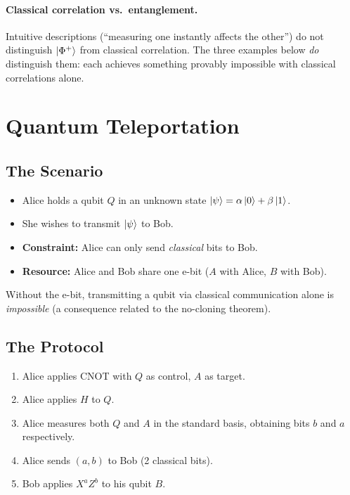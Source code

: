 \documentclass[11pt]{article}
\theoremstyle{definition}
\begin{document}
\paragraph{Classical correlation vs.\ entanglement.}
Intuitive descriptions (``measuring one instantly affects the other'') do not distinguish $\ket{\Phi^+}$ from classical correlation.  The three examples below \emph{do} distinguish them: each achieves something provably impossible with classical correlations alone.

\section{Quantum Teleportation}

\subsection{The Scenario}

\begin{itemize}
    \item Alice holds a qubit $Q$ in an unknown state $\ket{\psi}=\alpha\ket{0}+\beta\ket{1}$.
    \item She wishes to transmit $\ket{\psi}$ to Bob.
    \item \textbf{Constraint:} Alice can only send \emph{classical} bits to Bob.
    \item \textbf{Resource:} Alice and Bob share one e-bit ($A$ with Alice, $B$ with Bob).
\end{itemize}

Without the e-bit, transmitting a qubit via classical communication alone is \emph{impossible} (a consequence related to the no-cloning theorem).

\subsection{The Protocol}

\begin{enumerate}
    \item Alice applies CNOT with $Q$ as control, $A$ as target.
    \item Alice applies $H$ to $Q$.
    \item Alice measures both $Q$ and $A$ in the standard basis, obtaining bits $b$ and $a$ respectively.
    \item Alice sends $(a,b)$ to Bob (2 classical bits).
    \item Bob applies $X^a Z^b$ to his qubit $B$.
\end{enumerate}
\end{document}
